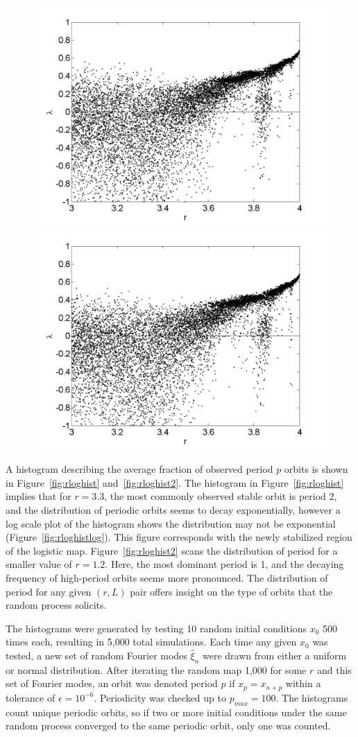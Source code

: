 \begin{figure}[!h]
\includegraphics[width=.5\textwidth]{figs/rlog_lyap_halfsig_L_08.png}\hfill
\includegraphics[width=.5\textwidth]{figs/rlog_lyap_halfsig_L_09.png}\\
\end{figure}

A histogram describing the average fraction of observed period $p$
orbits is shown in Figure~\ref{fig:rloghist}
and~\ref{fig:rloghist2}. The histogram in Figure~\ref{fig:rloghist} implies
that for $r=3.3$, the most commonly observed stable orbit is period 2, and the
distribution of periodic orbits seems to decay exponentially, however
a log scale plot of the histogram shows the distribution may not be
exponential (Figure~\ref{fig:rloghistlog}). This figure corresponds with the newly stabilized region
of the logistic map. Figure~\ref{fig:rloghist2} scans the distribution
of period for a smaller value of $r=1.2$. Here, the most dominant
period is 1, and the decaying frequency of high-period orbits seems
more pronounced. The distribution of period for any given $(r,L)$ pair
offers insight on the type of orbits that the random process solicits.

The histograms were generated by testing 10 random initial conditions $x_0$ 500 times
each, resulting in 5,000 total simulations. Each time any given $x_0$
was tested, a new set of random Fourier modes $\hat{\xi}_n$ were drawn
from either a uniform or normal distribution. After iterating the random
map 1,000 for some $r$ and this set of Fourier modes, an orbit was denoted period $p$ if $x_p = x_{n+p}$ within a
tolerance of $\epsilon = 10^{-6}$. Periodicity was checked up to
$p_{max}=100$. The histograms count unique periodic orbits, so if two
or more initial conditions under the same random process converged to the same periodic orbit, only
one was counted. 

